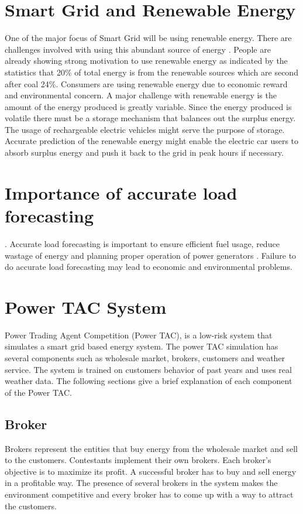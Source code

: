 \section{Smart Grid and Renewable Energy}
One of the major focus of Smart Grid will be using renewable energy. There are challenges involved with using this abundant source of energy \cite{richter2012transitioning}. People are already showing strong motivation to use renewable energy as indicated by the statistics that 20\% of total energy is from the renewable sources which are second after coal 24\%. Consumers are using renewable energy due to economic reward and environmental concern. A major challenge with renewable energy is the amount of the energy produced is greatly variable. Since the energy produced is volatile there must be a storage mechanism that balances out the surplus energy. The usage of rechargeable electric vehicles might serve the purpose of storage. Accurate prediction of the renewable energy might enable the electric car users to absorb surplus energy and push it back to the grid in peak hours if necessary. 




\section{Importance of accurate load forecasting}.
Accurate load forecasting is important to ensure efficient fuel usage, reduce wastage of energy and planning proper operation of power generators \cite{liu2006accurate}. Failure to do accurate load forecasting may lead to economic and environmental problems.


\section{Power TAC System}

Power Trading Agent Competition (Power TAC), is a low-risk system that simulates a smart grid based energy system. The power TAC simulation has several components such as wholesale market, brokers, customers and weather service. The system is trained on customers behavior of past years and uses real weather data. The following sections give a brief explanation of each component of the Power TAC. 

\subsection{Broker}
Brokers represent the entities that buy energy from the wholesale market and sell to the customers. Contestants implement their own brokers. Each broker's objective is to maximize its profit. A successful broker has to buy and sell energy in a profitable way. The presence of several brokers in the system makes the environment competitive and every broker has to come up with a way to attract the customers.

